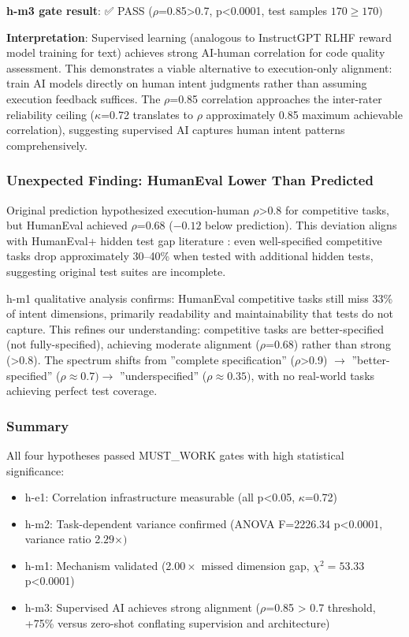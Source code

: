 \textbf{h-m3 gate result}: ✅ PASS ($\rho$=0.85>0.7, p<0.0001, test samples $170\geq 170)$

\textbf{Interpretation}: Supervised learning (analogous to InstructGPT RLHF reward model training for text) achieves strong AI-human correlation for code quality assessment. This demonstrates a viable alternative to execution-only alignment: train AI models directly on human intent judgments rather than assuming execution feedback suffices. The $\rho$=0.85 correlation approaches the inter-rater reliability ceiling ($\kappa$=0.72 translates to $\rho$ approximately 0.85 maximum achievable correlation), suggesting supervised AI captures human intent patterns comprehensively.

\subsubsection{Unexpected Finding: HumanEval Lower Than Predicted}

Original prediction hypothesized execution-human $\rho$>0.8 for competitive tasks, but HumanEval achieved $\rho$=0.68 ($-0.12$ below prediction). This deviation aligns with HumanEval+ hidden test gap literature \citep{liu2023your}: even well-specified competitive tasks drop approximately 30--40\% when tested with additional hidden tests, suggesting original test suites are incomplete.

h-m1 qualitative analysis confirms: HumanEval competitive tasks still miss 33\% of intent dimensions, primarily readability and maintainability that tests do not capture. This refines our understanding: competitive tasks are better-specified (not fully-specified), achieving moderate alignment ($\rho$=0.68) rather than strong (>0.8). The spectrum shifts from ''complete specification'' ($\rho$>0.9) $\rightarrow$ ''better-specified'' ($\rho\approx 0.7) \rightarrow$ ''underspecified'' ($\rho\approx 0.35)$, with no real-world tasks achieving perfect test coverage.

\subsubsection{Summary}

All four hypotheses passed MUST\_WORK gates with high statistical significance:
\begin{itemize}
\item h-e1: Correlation infrastructure measurable (all p<0.05, $\kappa$=0.72)
\item h-m2: Task-dependent variance confirmed (ANOVA F=2226.34 p<0.0001, variance ratio 2.$29\times )$
\item h-m1: Mechanism validated (2.$00\times$ missed dimension gap, $\chi^{2}=53.33$ p<0.0001)
\item h-m3: Supervised AI achieves strong alignment ($\rho$=0.85 > 0.7 threshold, +75\% versus zero-shot conflating supervision and architecture)
\end{itemize}

